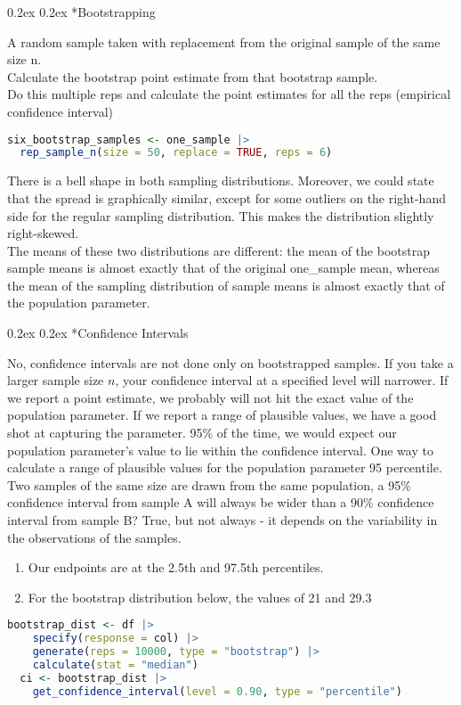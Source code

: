\documentclass[8pt,landscape]{article}
\makeatletter
\renewcommand{\subsection}{\@startsection{subsection}{2}{0pt}%
    {0.2ex}%
    {0.2ex}%
    {\fontsize{8}{8}\bfseries\color{blue}}} %
\newcommand{\smalltext}[1]{%
  {\fontsize{8}{7}\selectfont\sloppy #1\par}%
}
\makeatother
\begin{document}
\begin{multicols}{3}
\subsection*{Bootstrapping}
\smalltext{
A random sample taken with replacement from the original sample of the same size n. \\
Calculate the bootstrap point estimate from that bootstrap sample. \\
Do this multiple reps and calculate the point estimates for all the reps (empirical confidence interval)
}
\begin{lstlisting}[language=R]
  six_bootstrap_samples <- one_sample |>
  rep_sample_n(size = 50, replace = TRUE, reps = 6)
\end{lstlisting}
\smalltext{There is a bell shape in both sampling distributions. Moreover, we could state that the spread is graphically similar, except for some outliers on the right-hand side for the regular sampling distribution. This makes the distribution slightly right-skewed. \\
The means of these two distributions are different: the mean of the bootstrap sample means is almost exactly that of the original one\_sample mean, whereas the mean of the sampling distribution of sample means is almost exactly that of the population parameter.
}
\subsection*{Confidence Intervals}
\smalltext{No, confidence intervals are not done only on bootstrapped samples.
If you take a larger sample size $n$, your confidence interval at a specified level will narrower.
If we report a point estimate, we probably will not hit the exact value of the population parameter.
If we report a range of plausible values, we have a good shot at capturing the parameter.
95\% of the time, we would expect our population parameter’s value to lie within the confidence interval.
One way to calculate a range of plausible values for the population parameter 95 percentile.
Two samples of the same size are drawn from the same population, a 95\% confidence interval from sample A will always be wider than a 90\% confidence interval from sample B? True, but not always - it depends on the variability in the observations of the samples.
}
\begin{enumerate}\fontsize{8}{8}\selectfont
\item Our endpoints are at the 2.5th and 97.5th percentiles.
\item For the bootstrap distribution below, the values of 21 and 29.3
\end{enumerate}
\begin{lstlisting}[language=R]
  bootstrap_dist <- df |>
    specify(response = col) |>
    generate(reps = 10000, type = "bootstrap") |>
    calculate(stat = "median")
  ci <- bootstrap_dist |>
    get_confidence_interval(level = 0.90, type = "percentile")
\end{lstlisting}


\end{multicols}
\end{document}

